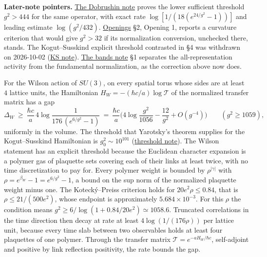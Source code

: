\documentclass[11pt,a4paper]{article}
\begin{document}
\textbf{Later-note pointers.} \href{dobrushin-uniqueness-wilson.md}{The
Dobrushin note} proves the lower sufficient threshold \(g^2>444\) for
the same operator, with exact rate \(\log[1/(18(e^{24/g^2}-1))]\) and
leading estimate \(\log(g^2/432)\).
\href{mass-gap-openings.md}{Openings} §2, Opening 1, reports a curvature
criterion that would give \(g^2>32\) if its normalization conversion,
unchecked there, stands. The Kogut--Susskind explicit threshold
contrasted in §4 was withdrawn on 2026-10-02
(\href{strong-coupling-uniform-gap.md\#continuous-time-histories-and-the-corrected-overlap-criterion}{KS
note}).
\href{mass-gap-conditional-theorem.md\#numerical-orientation-and-its-limits}{The
bands note} §1 separates the all-representation activity from the
fundamental normalization, as the correction above now does.

For the Wilson action of \(SU(3)\), on every spatial torus whose sides
are at least \(4\) lattice units, the Hamiltonian
\(H_W=-(\hbar c/a)\log\mathcal T\) of the normalized transfer matrix has
a gap
\[\Delta_W\ \ge\ \frac{\hbar c}{a}\,4\log\frac{1}{176\,(e^{6/g^2}-1)}
\ =\ \frac{\hbar c}{a}\Big(4\log\frac{g^2}{1056}-\frac{12}{g^2}+O(g^{-4})\Big)
\qquad(g^2\ge1059),\] uniformly in the volume. The threshold that
Yarotsky's theorem supplies for the Kogut--Susskind Hamiltonian is
\(g_0^2\sim10^{101}\)
(\href{strong-coupling-uniform-gap.md\#continuous-time-histories-and-the-corrected-overlap-criterion}{threshold
note}). The Wilson statement has an explicit threshold because the
Euclidean character expansion is a polymer gas of plaquette sets
covering each of their links at least twice, with no time discretization
to pay for. Every polymer weight is bounded by \(\rho^{|\gamma|}\) with
\(\rho=e^{\beta_W}-1=e^{6/g^2}-1\), a bound on the sup norm of the
normalized plaquette weight minus one. The Kotecký--Preiss criterion
holds for \(20e^2\rho\le0.84\), that is \(\rho\le21/(500e^2)\), whose
endpoint is approximately \(5.684\times10^{-3}\). For this \(\rho\) the
condition means \(g^2\ge6/\log(1+0.84/20e^2)\simeq1058.6\). Truncated
correlations in the time direction then decay at rate at least
\(4\log(1/(176\rho))\) per lattice unit, because every time slab between
two observables holds at least four plaquettes of one polymer. Through
the transfer matrix \(\mathcal T=e^{-aH_W/\hbar c}\), self-adjoint and
positive by link reflection positivity, the rate bounds the gap.
\end{document}
